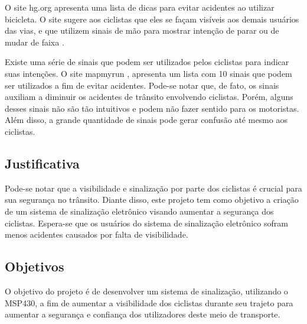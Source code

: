 \documentclass[conference]{IEEEtran}
\begin{document}
O site hg.org apresenta uma lista de dicas para evitar acidentes ao utilizar bicicleta. O site sugere aos ciclistas que eles se façam visíveis aos demais usuários das vias, e que utilizem sinais de mão para mostrar intenção de parar ou de mudar de faixa \cite{b4}. 

Existe uma série de sinais que podem ser utilizados pelos ciclistas para indicar suas intenções. O site mapmyrun \cite{b5}, apresenta um lista com 10 sinais que podem ser utilizados a fim de evitar acidentes. Pode-se notar que, de fato, os sinais auxiliam a diminuir os acidentes de trânsito envolvendo ciclistas. Porém, alguns desses sinais não são tão intuitivos e podem não fazer sentido para os motoristas. Além disso, a grande quantidade de sinais pode gerar confusão até mesmo aos ciclistas. 


\subsection{Justificativa}
Pode-se notar que a visibilidade e sinalização por parte dos ciclistas é crucial para sua segurança no trânsito. Diante disso, este projeto tem como objetivo a criação de um sistema de sinalização eletrônico visando aumentar a segurança dos ciclistas. Espera-se que os usuários do sistema de sinalização eletrônico sofram menos acidentes causados por falta de visibilidade.

\subsection{Objetivos}
O objetivo do projeto é de desenvolver um sistema de sinalização, utilizando o
MSP430, a fim de aumentar a visibilidade dos ciclistas durante seu trajeto para
aumentar a segurança e confiança dos utilizadores deste meio de transporte.
\end{document}
